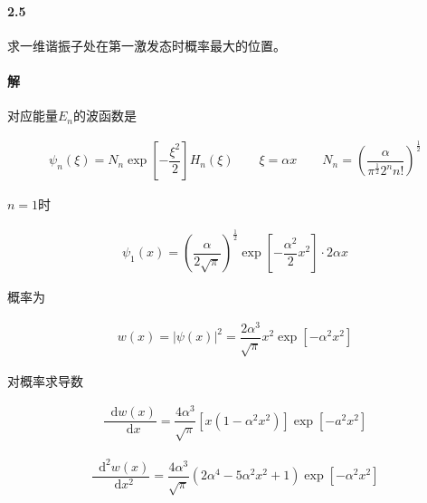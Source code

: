 \documentclass{article}
\newcommand*{\md}{\mathop{}\!\mathrm{d}}
\begin{document}
\paragraph{2.5}

求一维谐振子处在第一激发态时概率最大的位置。

\paragraph{解}

对应能量$E_n$的波函数是

\begin{equation*}
  \begin{aligned}
    \psi_n \left( \xi \right)
    = N_n \exp \left[ - \dfrac{\xi^2}{2}  \right] H_n \left( \xi \right)
    \quad\quad
    \xi = \alpha x
    \quad\quad
    N_n
    = \left( \dfrac{\alpha}{\pi^{\frac{1}{2} } 2^n n!}  \right)^{\frac{1}{2} }
  \end{aligned}
\end{equation*}

$n=1$时

\begin{equation*}
  \begin{aligned}
    \psi_1 \left( x \right)
    = \left( \dfrac{\alpha}{2\sqrt{\pi}}  \right)^{\frac{1}{2}} \exp \left[ - \dfrac{\alpha^2}{2} x^2  \right] \cdot 2\alpha x
  \end{aligned}
\end{equation*}

概率为

\begin{equation*}
  \begin{aligned}
    w \left( x \right)
    = \left| \psi \left( x \right) \right|^2
    = \dfrac{2 \alpha^3}{\sqrt{\pi}} x^2 \exp \left[ - \alpha^2 x^2 \right]
  \end{aligned}
\end{equation*}

对概率求导数

\begin{equation*}
  \begin{aligned}
    \dfrac{\md w \left( x \right)}{\md x}
    = \dfrac{4 \alpha^3}{\sqrt{\pi}} \left[ x \left( 1 - \alpha^2 x^2 \right) \right] \exp \left[ -a^2 x^2 \right]
  \end{aligned}
\end{equation*}

\begin{equation*}
  \begin{aligned}
    \dfrac{\md^2 w \left( x \right)}{\md x^2}
    = \dfrac{4\alpha^3}{\sqrt{\pi}} \left( 2 \alpha^4 - 5 \alpha^2 x^2 + 1 \right) \exp \left[ - \alpha^2 x^2 \right]
  \end{aligned}
\end{equation*}
\end{document}
